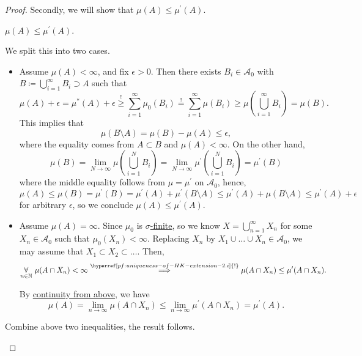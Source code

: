 \begin{proof}
	Secondly, we will show that \(\mu (A)\leq \mu ^\prime (A)\).
	\begin{claim}
		\(\mu (A)\leq \mu ^\prime (A)\).
	\end{claim}
	\begin{explanation}
		We split this into two cases.
		\begin{itemize}
			\item \label{pf:uniqueness-of-HK-extension-2.i}Assume \(\mu (A)<\infty \), and fix \(\epsilon >0\). Then there exists \(B_{i}\in\mathcal{A} _0\) with \(B\coloneqq \bigcup\limits_{i=1}^{\infty} B_{i}\supset A\)
			      such that
			      \[
				      \mu (A)+\epsilon = \mu ^{\ast} (A) + \epsilon\overset{\hyperref[prop:outer-measure]{!}}{\geq} \sum\limits_{i=1}^{\infty} \mu _0(B_{i}) \overset{\hyperref[def:pre-measure-countable-additivity-within-the-algebra]{!}}{=} \sum\limits_{i=1}^{\infty} \mu (B_{i})\geq \mu \left(\bigcup\limits_{i=1}^{\infty} B_{i}\right) = \mu (B).
			      \]
			      This implies that
			      \[
				      \mu (B\setminus A) = \mu (B) - \mu (A)\leq \epsilon,
			      \]
			      where the equality comes from \(A\subset B\) and \(\mu (A)<\infty \). On the other hand,
			      \[
				      \mu (B) = \lim\limits_{N \to \infty} \mu \left(\bigcup\limits_{i=1}^{N} B_{i}\right) = \lim\limits_{N \to \infty} \mu ^\prime \left(\bigcup\limits_{i=1}^{N} B_{i}\right) = \mu ^\prime (B)
			      \]
			      where the middle equality follows from \(\mu  = \mu ^\prime \) on \(\mathcal{A} _0\), hence,
			      \[
				      \mu (A)\leq \mu (B) = \mu ^\prime (B) = \mu ^\prime (A)+\mu ^\prime (B\setminus A) \leq \mu ^\prime (A) + \mu (B\setminus A) \leq \mu ^\prime (A) + \epsilon
			      \]
			      for arbitrary \(\epsilon \), so we conclude \(\mu (A)\leq \mu ^\prime (A)\).
			\item Assume \(\mu (A) = \infty \). Since \(\mu _0\) is \hyperref[def:finite-measure]{\(\sigma \)-finite}, so we know \(X = \bigcup\limits_{n=1}^{\infty} X_{n}\) for some \(X_{n}\in\mathcal{A} _0\) such that
			      \(\mu _0(X_{n})<\infty\).  Replacing \(X_{n}\) by \(X_{1}\cup \ldots \cup X_{n} \in\mathcal{A} _0\), we may assume that \(X_1 \subset X_2 \subset \ldots\).
			      Then,
			      \[
				      \underset{n\in\mathbb{\MakeUppercase{N}} }{\forall}\ \mu (A \cap X_{n})<\infty\overset{\hyperref[pf:uniqueness-of-HK-extension-2.i]{!}}{\implies} \mu (A\cap X_{n})\leq \mu ^\prime (A\cap X_{n}).
			      \]

			      By \hyperref[thm:measure-space-continuity-from-above]{continuity from above}, we have
			      \[
				      \mu (A) = \lim\limits_{n \to \infty} \mu (A\cap X_{n})\leq \lim\limits_{n \to \infty} \mu ^\prime (A\cap X_{n}) = \mu ^\prime (A).
			      \]
		\end{itemize}
		Combine above two inequalities, the result follows.
	\end{explanation}
\end{proof}

